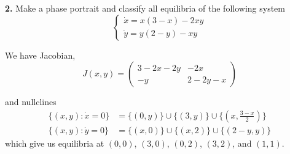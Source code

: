 \documentclass[12pt]{article}
\newcommand*{\tbf}[1]{\ifmmode\mathbf{#1}\else\textbf{#1}\fi}
\begin{document}
\begin{enumerate}[(a)]
\begin{center}
          \end{center}
\end{enumerate}


\tbf{2.} Make a phase portrait and classify all equilibria of the following system
\[\begin{cases}
        \dot x = x(3 - x) - 2xy \\
        \dot y = y(2- y) - xy
    \end{cases}\]

\color{blue}

We have Jacobian,
\[J(x, y) = \begin{pmatrix}
        3- 2x - 2y & -2x        \\
        -y         & 2 - 2y - x
    \end{pmatrix}\]

and nullclines
\begin{align*}
    \{(x, y): \dot x = 0\} & = \{(0, y)\} \cup \{(3, y)\} \cup \{(x, \frac{3-x}{2})\} \\
    \{(x, y): \dot y = 0\} & = \{(x, 0)\} \cup \{(x, 2)\} \cup \{(2-y, y)\}
\end{align*}
which give us equilibria at $(0, 0)$, $(3, 0)$, $(0, 2)$, $(3, 2)$, and $(1, 1)$.
\end{document}
